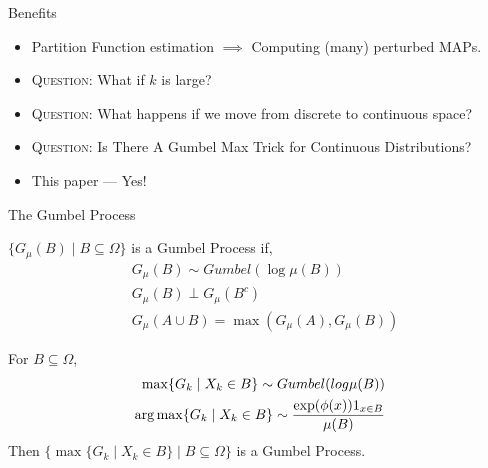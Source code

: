 \begin{frame}{Benefits}
  \begin{itemize}[<+->]
  \item Partition Function estimation $\implies$ Computing (many) perturbed MAPs.
  \end{itemize}
  
  \begin{itemize}[<+->]
  \item \textsc{Question:} What if $k$ is large?
  \item \textsc{Question:} What happens if we move from discrete to continuous space?
  \item \textsc{Question:} Is There A Gumbel Max Trick for Continuous Distributions?
  \item {\color{red} This paper --- Yes!}
  \end{itemize}
\end{frame}

\begin{frame}{The Gumbel Process}
    \footnotesize{
  \begin{definition}
    $\{G_\mu(B) \mid B \subseteq \Omega\}$ is a Gumbel Process if,
    \begin{align*} 
      & G_\mu(B) \sim Gumbel(\log \mu(B)) \tag{samples are regional maxes}\\
      & G_\mu(B) \perp G_\mu(B^c) \tag{regional maxes are independent}\\
      & G_\mu(A \cup B) = \max(G_\mu(A),G_\mu(B)) \tag{maxes are consistent}
    \end{align*}
  \end{definition}
  \begin{property}
    For $B \subseteq \Omega$,
    \begin{align*}
      \max \{G_k \mid X_k \in B\} \sim Gumbel(log \mu(B)) \\
      \operatorname*{{arg\,max}} \{G_k \mid X_k \in B\} \sim \frac{\exp(\phi(x))1_{x \in B}}{\mu(B)}
    \end{align*}
    Then $\{ \max \{G_k \mid X_k \in B\} \mid B \subseteq \Omega\}$ is a Gumbel Process.
  \end{property}
  }
\end{frame}

